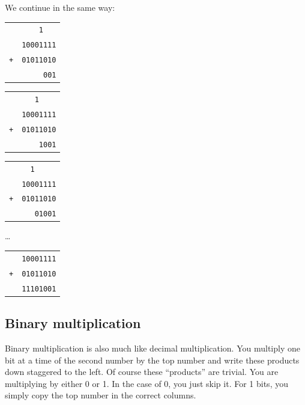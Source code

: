 \documentclass[11pt,b5paper]{book}
\begin{document}
We continue in the same way:

\begin{center}
\begin{tabular}{cr}
         & {\tt 1\ \ \ } \\
         & {\tt 10001111} \\
 {\tt +} & {\tt 01011010} \\
\hline
         & {\tt 001}
\end{tabular}
\end{center}

\begin{center}
\begin{tabular}{cr}
         & {\tt 1\ \ \ \ } \\
         & {\tt 10001111} \\
 {\tt +} & {\tt 01011010} \\
\hline
         & {\tt 1001}
\end{tabular}
\end{center}

\begin{center}
\begin{tabular}{cr}
         & {\tt 1\ \ \ \ \ } \\
         & {\tt 10001111} \\
 {\tt +} & {\tt 01011010} \\
\hline
         & {\tt 01001}
\end{tabular}
\end{center}

\begin{center}
\ldots
\end{center}

\begin{center}
\begin{tabular}{cr}
         & {\tt 10001111} \\
 {\tt +} & {\tt 01011010} \\
\hline
         & {\tt 11101001}
\end{tabular}
\end{center}

\subsection{Binary multiplication}

Binary multiplication is also much like decimal multiplication.
You multiply one bit at a time of the second number by the top number and write these
products down staggered to the left.
Of course these ``products'' are trivial.
You are multiplying by either 0 or 1.
In the case of 0, you just skip it.
For 1 bits, you simply copy the top number in the correct columns.
\end{document}
